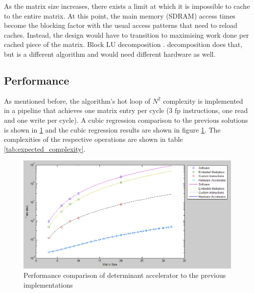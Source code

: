 \documentclass[]{article}
\begin{document}
As the matrix size increases, there exists a limit at which it is impossible to cache to the entire matrix. At this point, the main memory (SDRAM) access times become the blocking factor with the usual access patterns that need to reload caches. Instead, the design would have to transition to maximising work done per cached piece of the matrix. Block LU decomposition \cite{LUgen}. decomposition does that, but is a different algorithm and would need different hardware as well.

\subsection{Performance} %
\label{sub:performancedet}


As mentioned before, the algorithm’s hot loop of $N^2$ complexity is implemented in a pipeline that achieves one matrix entry per cycle (3 fp instructions, one read and one write per cycle). A cubic regression comparison to the previous solutions is shown in \ref{fig:det_bench_results} and the cubic regression results are shown in figure \ref{fig:det_bench_results}. The complexities of the respective operations are shown in table \ref{tab:expected_complexity}.
\begin{figure}[htbp]
	\begin{center}
		\includegraphics[width = \textwidth]{detcalcperf.PNG}
	\end{center}
	\caption{Performance comparison of determinant accelerator to the previous implementations}
	\label{fig:det_bench_results}
\end{figure}
	
\end{document}
